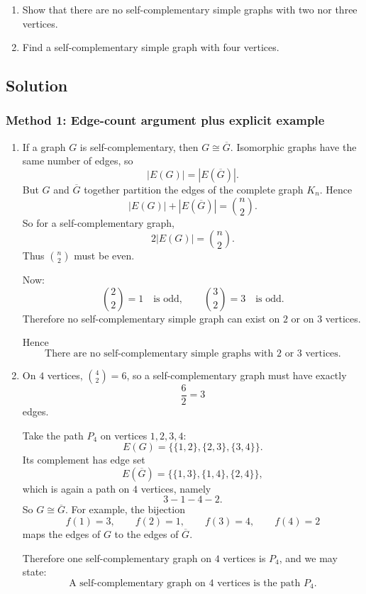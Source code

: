 \documentclass[12pt]{article}
\newcommand{\comp}[1]{\overline{#1}}
\begin{document}
\begin{enumerate}[label=(\alph*)]
\item Show that there are no self-complementary simple graphs with two nor three vertices.
\item Find a self-complementary simple graph with four vertices.
\end{enumerate}

\subsection{Solution}

\subsubsection{Method 1: Edge-count argument plus explicit example}
\begin{enumerate}[label=(\alph*)]
\item If a graph \(G\) is self-complementary, then \(G\cong \comp{G}\). Isomorphic graphs have the same number of edges, so
\[
|E(G)|=|E(\comp{G})|.
\]
But \(G\) and \(\comp{G}\) together partition the edges of the complete graph \(K_n\). Hence
\[
|E(G)|+|E(\comp{G})|=\binom{n}{2}.
\]
So for a self-complementary graph,
\[
2|E(G)|=\binom{n}{2}.
\]
Thus \(\binom{n}{2}\) must be even.

Now:
\[
\binom{2}{2}=1 \quad\text{is odd},\qquad \binom{3}{2}=3 \quad\text{is odd}.
\]
Therefore no self-complementary simple graph can exist on \(2\) or on \(3\) vertices.

Hence
\[
\boxed{\text{There are no self-complementary simple graphs with \(2\) or \(3\) vertices.}}
\]

\item On \(4\) vertices, \(\binom{4}{2}=6\), so a self-complementary graph must have exactly
\[
\frac{6}{2}=3
\]
edges.

Take the path \(P_4\) on vertices \(1,2,3,4\):
\[
E(G)=\bigl\{\{1,2\},\{2,3\},\{3,4\}\bigr\}.
\]
Its complement has edge set
\[
E(\comp{G})=\bigl\{\{1,3\},\{1,4\},\{2,4\}\bigr\},
\]
which is again a path on \(4\) vertices, namely
\[
3-1-4-2.
\]
So \(G\cong \comp{G}\). For example, the bijection
\[
f(1)=3,\qquad f(2)=1,\qquad f(3)=4,\qquad f(4)=2
\]
maps the edges of \(G\) to the edges of \(\comp{G}\).

Therefore one self-complementary graph on \(4\) vertices is \(P_4\), and we may state:
\[
\boxed{\text{A self-complementary graph on \(4\) vertices is the path }P_4.}
\]
\end{enumerate}
\end{document}
